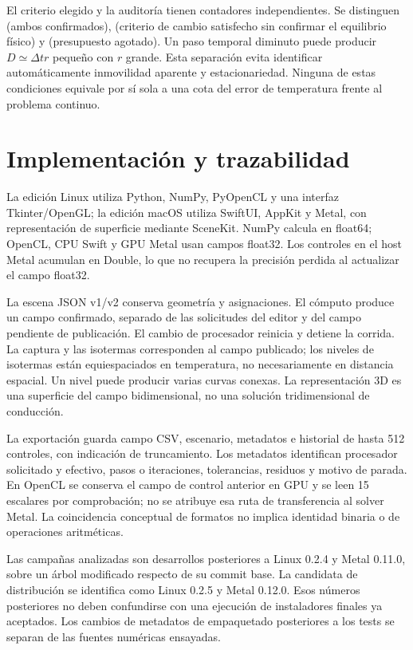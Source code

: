 \documentclass[11pt,a4paper]{article}
\newcommand{\code}[1]{\texttt{\detokenize{#1}}}
\newcommand{\dt}{\Delta t}
\begin{document}
El criterio elegido y la auditoría tienen contadores independientes. Se distinguen \code{converged} (ambos confirmados), \code{criterion_met} (criterio de cambio satisfecho sin confirmar el equilibrio físico) y \code{max_steps} (presupuesto agotado). Un paso temporal diminuto puede producir $D\simeq\dt r$ pequeño con $r$ grande. Esta separación evita identificar automáticamente inmovilidad aparente y estacionariedad. Ninguna de estas condiciones equivale por sí sola a una cota del error de temperatura frente al problema continuo.

\section{Implementación y trazabilidad}
La edición Linux utiliza Python, NumPy, PyOpenCL y una interfaz Tkinter/OpenGL; la edición macOS utiliza SwiftUI, AppKit y Metal, con representación de superficie mediante SceneKit. NumPy calcula en float64; OpenCL, CPU Swift y GPU Metal usan campos float32. Los controles en el host Metal acumulan en Double, lo que no recupera la precisión perdida al actualizar el campo float32.

La escena JSON v1/v2 conserva geometría y asignaciones. El cómputo produce un campo confirmado, separado de las solicitudes del editor y del campo pendiente de publicación. El cambio de procesador reinicia y detiene la corrida. La captura y las isotermas corresponden al campo publicado; los niveles de isotermas están equiespaciados en temperatura, no necesariamente en distancia espacial. Un nivel puede producir varias curvas conexas. La representación 3D es una superficie del campo bidimensional, no una solución tridimensional de conducción.

La exportación guarda campo CSV, escenario, metadatos e historial de hasta 512 controles, con indicación de truncamiento. Los metadatos identifican procesador solicitado y efectivo, pasos o iteraciones, tolerancias, residuos y motivo de parada. En OpenCL se conserva el campo de control anterior en GPU y se leen 15 escalares por comprobación; no se atribuye esa ruta de transferencia al solver Metal. La coincidencia conceptual de formatos no implica identidad binaria o de operaciones aritméticas.

Las campañas analizadas son desarrollos posteriores a Linux 0.2.4 y Metal 0.11.0, sobre un árbol modificado respecto de su commit base. La candidata de distribución se identifica como Linux 0.2.5 y Metal 0.12.0. Esos números posteriores no deben confundirse con una ejecución de instaladores finales ya aceptados. Los cambios de metadatos de empaquetado posteriores a los tests se separan de las fuentes numéricas ensayadas.
\end{document}
